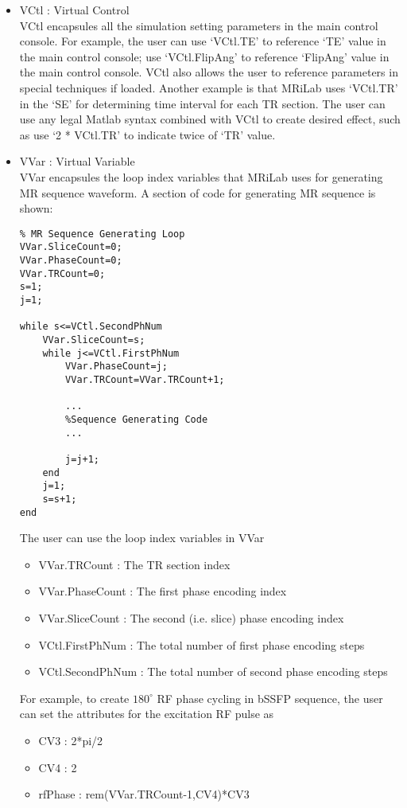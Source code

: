 \documentclass{book}%
\begin{document}
\begin{itemize}
	\item VCtl : Virtual Control \\
VCtl encapsules all the simulation setting parameters in the main control console. For example, the user can use `VCtl.TE' to reference `TE' value in the main control console; use `VCtl.FlipAng' to reference `FlipAng' value in the main control console. VCtl also allows the user to reference parameters in special techniques if loaded. Another example is that MRiLab uses `VCtl.TR' in the `SE' for determining time interval for each TR section. The user can use any legal Matlab syntax combined with VCtl to create desired effect, such as use `2 * VCtl.TR' to indicate twice of `TR' value.
	\item VVar : Virtual Variable \\
VVar encapsules the loop index variables that MRiLab uses for generating MR sequence waveform. A section of code for generating MR sequence is shown:

\begin{verbatim}
% MR Sequence Generating Loop
VVar.SliceCount=0;
VVar.PhaseCount=0;
VVar.TRCount=0;
s=1;
j=1;

while s<=VCtl.SecondPhNum
    VVar.SliceCount=s;
    while j<=VCtl.FirstPhNum
        VVar.PhaseCount=j;
        VVar.TRCount=VVar.TRCount+1;
				
        ...
        %Sequence Generating Code
        ...
				
        j=j+1;
    end
    j=1;
    s=s+1;
end
\end{verbatim}

The user can use the loop index variables in VVar

\begin{itemize}
	\item VVar.TRCount : The TR section index
	\item VVar.PhaseCount : The first phase encoding index
	\item VVar.SliceCount : The second (i.e. slice) phase encoding index
	\item VCtl.FirstPhNum : The total number of first phase encoding steps
	\item VCtl.SecondPhNum : The total number of second phase encoding steps
\end{itemize}	

For example, to create $180^{\circ}$ RF phase cycling in bSSFP sequence, the user can set the attributes for the excitation RF pulse as

\begin{itemize}
	\item CV3 : 2*pi/2
	\item CV4 : 2
	\item rfPhase : rem(VVar.TRCount-1,CV4)*CV3
\end{itemize}	

\end{itemize}	
\end{document}
